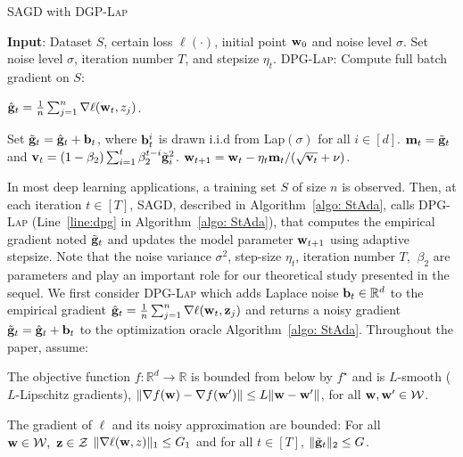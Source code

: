 \documentclass[11pt]{article}
\begin{document}
\begin{algorithm}[t] 
\caption{\textsc{SAGD} with \textsc{DGP-Lap}}
\begin{algorithmic}[1] \label{algo: StAda}
\STATE \textbf{Input}: Dataset $S$,  certain loss $\ell(\cdot)$, initial point $\mathbf{w}_0$ and noise level $\sigma$.
\STATE Set  noise level $\sigma$, iteration number $T$,  and stepsize $\eta_t$.
	\STATE  \textsc{DPG-Lap:} Compute full batch gradient on $S$: \\
	\centerline{ $\hat {\mathbf{g}}_t = \frac{1}{n} \sum_{j=1}^n\nabla \ell(\mathbf{w}_t, z_j)$.}	
	\STATE \label{line:dpg} Set $\tilde {\mathbf{g}}_t = \hat {\mathbf{g}}_t + \mathbf{b}_t$, where $\mathbf{b}_t^i$ is drawn i.i.d from Lap$(\sigma)$ for all $i \in [d]$.
\STATE  \label{line:adap1}
$\mathbf{m}_t = \tilde {\mathbf{g}}_t$ and $\mathbf{v}_t = \left(1-\beta_{2}\right) \sum_{i=1}^{t} \beta_{2}^{t-i} \tilde {\mathbf{g}}_{i}^{2}$.
\STATE  \label{line:adap2} $\mathbf{w}_{t+1}=\mathbf{w}_{t}-\eta_t \mathbf{m}_t /(\sqrt{\mathbf{v}_t}+\nu)$.
\ENDFOR 
\end{algorithmic}
\end{algorithm}
In most deep learning applications, a training set $S$ of size $n$ is observed.
Then, at each iteration $t \in [T]$, \textsc{SAGD}, described in Algorithm~\ref{algo: StAda}, calls \textsc{DPG-Lap} (Line~\ref{line:dpg} in Algorithm~\ref{algo: StAda}), that computes the empirical gradient noted $\tilde {\mathbf{g}}_t$ and updates the model parameter $\mathbf{w}_{t+1}$ using adaptive stepsize.
Note that the noise variance $\sigma^2$, step-size $\eta_t$, iteration number $T$, $~ \beta_2$ are parameters and play an important role for our theoretical study presented in the sequel. 
We first consider \textsc{DPG-Lap} which adds Laplace noise $\mathbf{b}_t \in \mathbb{R}^d$ to the empirical gradient $\hat {\mathbf{g}}_t = \frac{1}{n} \sum_{j=1}^n\nabla \ell(\mathbf{w}_t, \mathbf{z}_j)$ and returns a noisy gradient $\tilde {\mathbf{g}}_t = \hat {\mathbf{g}}_t + \mathbf{b}_t$ to the optimization oracle Algorithm~\ref{algo: StAda}. Throughout the paper, assume:
\begin{assumption}
The objective function $ f: \mathbb{R}^d \rightarrow \mathbb{R}$ is bounded from below by $f^\star$ and is $L$-smooth ($L$-Lipschitz gradients), \ie$\nonumber \|\nabla f(\mathbf{w}) -\nabla f(\mathbf{w}^\prime) \|\leq L \|\mathbf{w}-\mathbf{w}^\prime \|$, for all $\w, \w^\prime \in \cW$.
\end{assumption}
\begin{assumption}
The gradient of $\ell$ and its noisy approximation are bounded: For all $\w \in \cW, \  \z \in \cZ$ $\|\nabla \ell (\mathbf{w}, z) \|_1 \leq G_1$ and for all $t \in [T]$, $\|\tilde {\mathbf{g}}_t\|_2 \leq G$.
\end{assumption}
\end{document}
